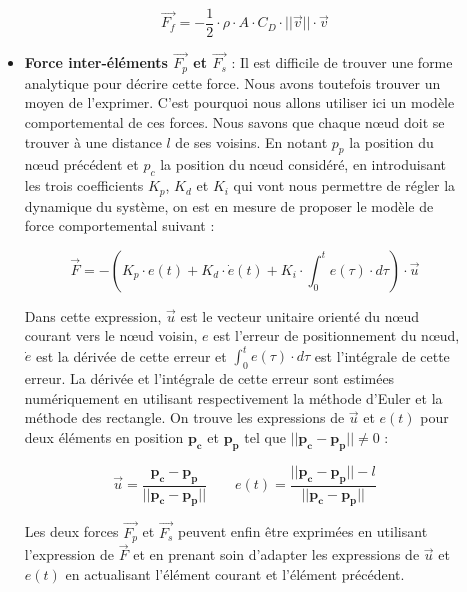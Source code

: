 \begin{description}
\begin{itemize}
						\begin{equation}
							\overrightarrow{F_f} = - \frac{1}{2} \cdot \rho \cdot A \cdot C_D \cdot ||\overrightarrow{v}|| \cdot \overrightarrow{v}
							\label{eq:drag}
						\end{equation}
						
						\item[\textbullet] \textbf{Force inter-éléments $\overrightarrow{F_p}$ et $\overrightarrow{F_s}$} : Il est difficile de trouver une forme analytique pour décrire cette force. Nous avons toutefois trouver un moyen de l'exprimer. C'est pourquoi nous allons utiliser ici un modèle comportemental de ces forces. Nous savons que chaque n\oe ud doit se trouver à une distance $l$ de ses voisins. En notant $p_{p}$ la position du n\oe ud précédent et $p_{c}$ la position du n\oe ud considéré, en introduisant les trois coefficients $K_p$, $K_d$ et $K_i$ qui vont nous permettre de régler la dynamique du système, on est en mesure de proposer le modèle de force comportemental suivant :
						
						\begin{equation}
							\overrightarrow{F} = - \left(K_p \cdot e(t) + K_d \cdot \dot e(t) + K_i \cdot \int_{0}^te(\tau) \cdot d\tau \right) \cdot \overrightarrow{u}
							\label{eq:pid}
						\end{equation}
						
						Dans cette expression, $\overrightarrow{u}$ est le vecteur unitaire orienté du n\oe ud courant vers le n\oe ud voisin, $e$ est l'erreur de positionnement du n\oe ud, $\dot e$ est la dérivée de cette erreur et $\int_{0}^te(\tau) \cdot d\tau$ est l'intégrale de cette erreur. La dérivée et l'intégrale de cette erreur sont estimées numériquement en utilisant respectivement la méthode d'Euler et la méthode des rectangle. On trouve les expressions de $\overrightarrow{u}$ et $e(t)$ pour deux éléments en position $\mathbf{p_c}$ et $\mathbf{p_p}$ tel que $||\mathbf{p_c} - \mathbf{p_p}|| \neq 0$ :

						\begin{equation}
							\overrightarrow{u} = \frac{\mathbf{p_c} - \mathbf{p_p}}{||\mathbf{p_c} - \mathbf{p_p}||} \qquad e(t) = \frac{||\mathbf{p_c} - \mathbf{p_p}|| - l}{||\mathbf{p_c} - \mathbf{p_p}||}
							\label{eq:behavioral}
						\end{equation}
						
						Les deux forces $\overrightarrow{F_p}$ et $\overrightarrow{F_s}$ peuvent enfin être exprimées en utilisant l'expression de $\overrightarrow{F}$ et en prenant soin d'adapter les expressions de $\overrightarrow{u}$ et $e(t)$ en actualisant l'élément courant et l'élément précédent.
					\end{itemize}
				\end{description}
			
